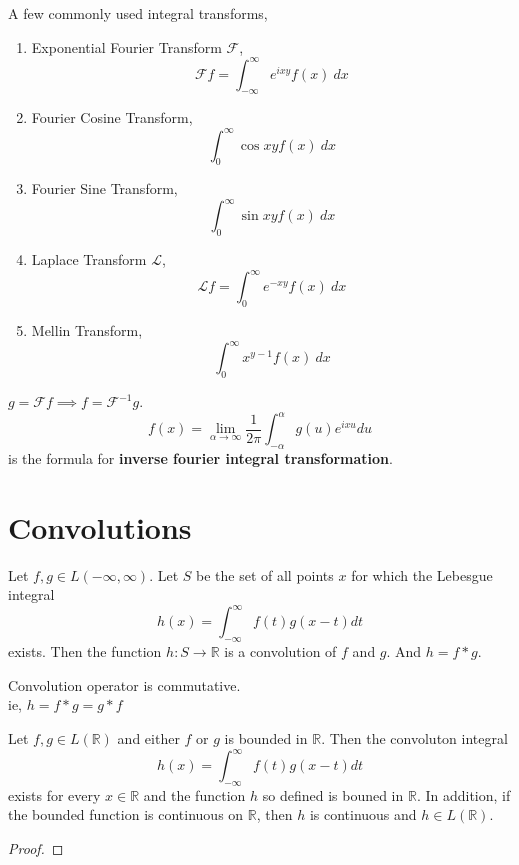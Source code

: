 \begin{remark} A few commonly used integral transforms,
\begin{enumerate}
	\item Exponential Fourier Transform $\mathscr{F}$,
		$$\mathscr{F}f = \int_{-\infty}^\infty e^{ixy}f(x)\ dx$$
	\item Fourier Cosine Transform,
		$$\int_0^\infty \cos xy f(x)\ dx$$
	\item Fourier Sine Transform,
		$$\int_0^\infty \sin xy f(x)\ dx$$
	\item Laplace Transform $\mathscr{L}$,
		$$\mathscr{L}f = \int_0^\infty e^{-xy} f(x)\ dx$$
	\item Mellin Transform,
		$$\int_0^\infty x^{y-1}f(x)\ dx$$
\end{enumerate}
\end{remark}

\begin{remark}
	$g = \mathscr{F}f \implies f = \mathscr{F}^{-1} g$.\\
	$$f(x) = \lim_{\alpha \to \infty} \frac{1}{2\pi}\int_{-\alpha}^\alpha g(u) e^{ixu} du$$
	is the formula for \textbf{inverse fourier integral transformation}.
\end{remark}

\section{Convolutions}
\begin{definition}
	Let $f,g \in L(-\infty,\infty)$. Let $S$ be the set of all points $x$ for which the Lebesgue integral
	$$h(x) = \int_{-\infty}^\infty f(t) g(x-t) dt$$
	exists. Then the function $h : S \to \mathbb{R}$ is a convolution of $f$ and $g$. And $h = f \ast g$.
\end{definition}

\begin{remark}
	Convolution operator is commutative.\\
	ie, $ h = f \ast g = g \ast f$
\end{remark}

\begin{theorem}
	Let $f,g \in L(\mathbb{R})$ and either $f$ or $g$ is bounded in $\mathbb{R}$. Then the convoluton integral
	$$h(x) = \int_{-\infty}^\infty f(t) g(x-t) dt$$
	exists for every $x \in \mathbb{R}$ and the function $h$ so defined is bouned in $\mathbb{R}$. In addition, if the bounded function is continuous on $\mathbb{R}$, then $h$ is continuous and $h \in L(\mathbb{R})$.
\end{theorem}
\begin{synopsis}
\end{synopsis}
\begin{proof}
\end{proof}

